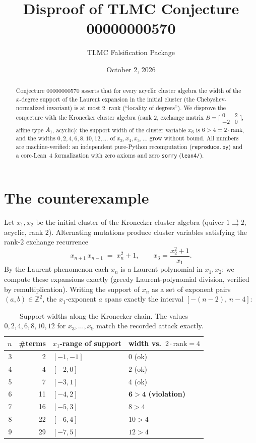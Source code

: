 \documentclass[11pt]{article}
\title{Disproof of TLMC Conjecture 00000000570}
\author{TLMC Falsification Package}
\date{October 2, 2026}
\begin{document}
\maketitle

\begin{abstract}
Conjecture 00000000570 asserts that for every acyclic cluster algebra the
width of the $x$-degree support of the Laurent expansion in the initial
cluster (the Chebyshev-normalized invariant) is at most $2\cdot\mathrm{rank}$
(``locality of degrees'').  We disprove the conjecture with the Kronecker
cluster algebra (rank $2$, exchange matrix $B=\bigl[\begin{smallmatrix}0&2\\-2&0\end{smallmatrix}\bigr]$,
affine type $\widetilde A_1$, acyclic): the support width of the cluster
variable $x_6$ is $6 > 4 = 2\cdot\mathrm{rank}$, and the widths
$0,2,4,6,8,10,12,\dots$ of $x_3,x_4,x_5,\dots$ grow without bound.
All numbers are machine-verified: an independent pure-Python recomputation
(\texttt{reproduce.py}) and a core-Lean~4 formalization with zero axioms and
zero \texttt{sorry} (\texttt{lean4/}).
\end{abstract}

\section{The counterexample}

Let $x_1,x_2$ be the initial cluster of the Kronecker cluster algebra
(quiver $1 \rightrightarrows 2$, acyclic, rank $2$).  Alternating mutations
produce cluster variables satisfying the rank-2 exchange recurrence
\[
x_{n+1}\,x_{n-1} \;=\; x_n^2 + 1, \qquad x_3 = \frac{x_2^2+1}{x_1}.
\]
By the Laurent phenomenon each $x_n$ is a Laurent polynomial in $x_1,x_2$;
we compute these expansions exactly (greedy Laurent-polynomial division,
verified by remultiplication).  Writing the support of $x_n$ as a set of
exponent pairs $(a,b)\in\mathbb{Z}^2$, the $x_1$-exponent $a$ spans exactly
the interval $[-(n-2),\,n-4]$:

\begin{table}[h]
\centering
\begin{tabular}{rrll}
\toprule
$n$ & \#terms & $x_1$-range of support & width vs.\ $2\cdot\mathrm{rank}=4$ \\
\midrule
3 & 2  & $[-1,-1]$ & $0$ (ok) \\
4 & 4  & $[-2,0]$  & $2$ (ok) \\
5 & 7  & $[-3,1]$  & $4$ (ok) \\
6 & 11 & $[-4,2]$  & $\mathbf{6 > 4}$ \textbf{(violation)} \\
7 & 16 & $[-5,3]$  & $8 > 4$ \\
8 & 22 & $[-6,4]$  & $10 > 4$ \\
9 & 29 & $[-7,5]$  & $12 > 4$ \\
\bottomrule
\end{tabular}
\caption{Support widths along the Kronecker chain.  The values
$0,2,4,6,8,10,12$ for $x_3,\dots,x_9$ match the recorded attack exactly.}
\end{table}
\end{document}
